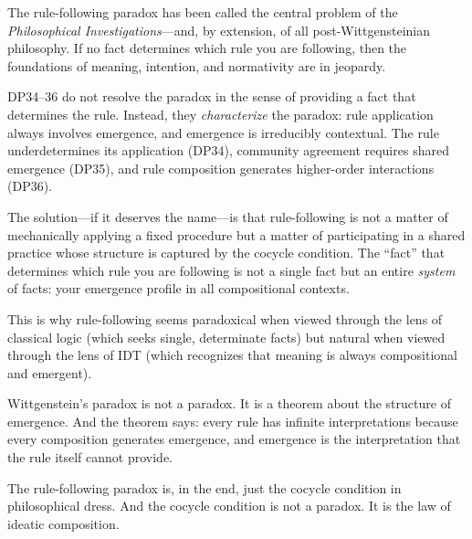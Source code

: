 The rule-following paradox has been called the central problem of
the \textit{Philosophical Investigations}---and, by extension, of
all post-Wittgensteinian philosophy.  If no fact determines which
rule you are following, then the foundations of meaning, intention,
and normativity are in jeopardy.

DP34--36 do not resolve the paradox in the sense of providing a
fact that determines the rule.  Instead, they \emph{characterize}
the paradox: rule application always involves emergence, and
emergence is irreducibly contextual.  The rule underdetermines its
application (DP34), community agreement requires shared emergence
(DP35), and rule composition generates higher-order interactions
(DP36).

The solution---if it deserves the name---is that rule-following is
not a matter of mechanically applying a fixed procedure but a matter
of participating in a shared practice whose structure is captured by
the cocycle condition.  The ``fact'' that determines which rule you
are following is not a single fact but an entire \emph{system} of
facts: your emergence profile in all compositional contexts.

This is why rule-following seems paradoxical when viewed through the
lens of classical logic (which seeks single, determinate facts) but
natural when viewed through the lens of IDT (which recognizes that
meaning is always compositional and emergent).

Wittgenstein's paradox is not a paradox.  It is a theorem about the
structure of emergence.  And the theorem says: every rule has infinite
interpretations because every composition generates emergence, and
emergence is the interpretation that the rule itself cannot provide.

The rule-following paradox is, in the end, just the cocycle condition
in philosophical dress.  And the cocycle condition is not a paradox.
It is the law of ideatic composition.
